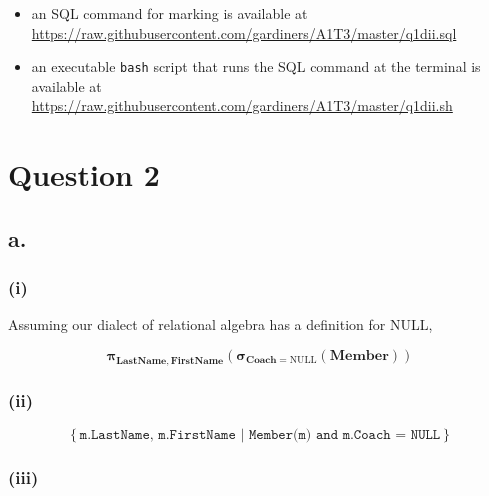 \documentclass{article}
\newcommand{\select}[1]{
\boldsymbol{\sigma}_{#1}
}
\newcommand{\project}[1]{
\boldsymbol{\pi}_{#1}
}
\begin{document}
\begin{itemize}
    \item an SQL command for marking is available at \url{https://raw.githubusercontent.com/gardiners/A1T3/master/q1dii.sql}
    \item an executable \texttt{bash} script that runs the SQL command at the terminal is available at \url{https://raw.githubusercontent.com/gardiners/A1T3/master/q1dii.sh}
\end{itemize}

\section{Question 2}

\subsection{a.}

\subsubsection{(i)}

Assuming our dialect of relational algebra has a definition for NULL,

$$
\project{\mathbf{LastName, FirstName}}
\left(
\select{\mathbf{Coach} = \text{NULL}}\left(\mathbf{Member}\right)
\right)
$$

\subsubsection{(ii)}

$$
\left\{
\texttt{m.LastName, m.FirstName | Member(m) and m.Coach = NULL}
\right\}
$$

\subsubsection{(iii)}

\end{document}
